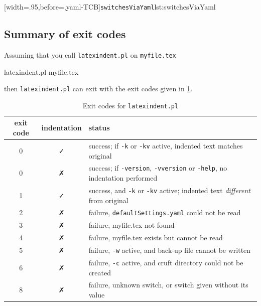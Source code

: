 [width=.95\linewidth,before=\centering,yaml-TCB]{\texttt{switchesViaYaml}}{lst:switchesViaYaml}

\subsection{Summary of exit codes}
 Assuming that you call \texttt{latexindent.pl} on \texttt{myfile.tex}

 \begin{commandshell}
latexindent.pl myfile.tex
\end{commandshell}

 then \texttt{latexindent.pl} can exit with the exit codes given in
 \cref{tab:exit-codes}.

 \begin{table}[!htb]
  \caption{Exit codes for \texttt{latexindent.pl}}
  \label{tab:exit-codes}
  \begin{tabular}{ccl}
   \toprule
   exit code & indentation & status                                                                                        \\
   \midrule
   0         & \faCheck    & success; if \texttt{-k} or \texttt{-kv} active, indented text matches original                \\
   0         & \faClose    & success; if \texttt{-version}, \texttt{-vversion} or \texttt{-help}, no indentation performed \\
   1         & \faCheck    & success, and \texttt{-k} or \texttt{-kv} active; indented text \emph{different} from original \\
   \midrule
   2         & \faClose    & failure, \texttt{defaultSettings.yaml} could not be read                                      \\
   3         & \faClose    & failure, myfile.tex not found                                                                 \\
   4         & \faClose    & failure, myfile.tex exists but cannot be read                                                 \\
   5         & \faClose    & failure, \texttt{-w} active, and back-up file cannot be written                               \\
   6         & \faClose    & failure, \texttt{-c} active, and cruft directory could not be created                         \\
   8         & \faClose    & failure, unknown switch, or switch given without its value                                    \\
   \bottomrule
  \end{tabular}
 \end{table}

